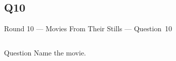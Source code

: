\documentclass[11pt]{beamer}
\begin{document}
\subsection*{Q10}
\begin{frame}[t]{Round 10 --- Movies From Their Stills --- \mbox{Question 10}}
    \vspace{-0.5em}
    \begin{columns}[T,totalwidth=\linewidth]
        \begin{column}{0.32\linewidth}
            \begin{block}{Question}
                Name the movie.
            \end{block}
        \end{column}
        \begin{column}{0.65\linewidth}
            \begin{center}
                \texttt{[image: \{Images/wonderfullife]}.jpeg}
            \end{center}
        \end{column}
    \end{columns}
\end{frame}
\end{document}
